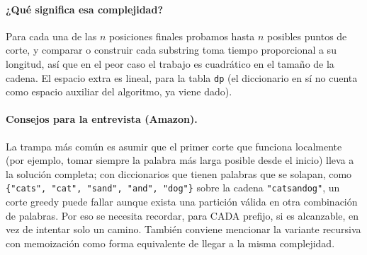 


\paragraph{¿Qué significa esa complejidad?} Para cada una de las $n$
posiciones finales probamos hasta $n$ posibles puntos de corte, y comparar o
construir cada substring toma tiempo proporcional a su longitud, así que en
el peor caso el trabajo es cuadrático en el tamaño de la cadena. El espacio
extra es lineal, para la tabla \texttt{dp} (el diccionario en sí no cuenta
como espacio auxiliar del algoritmo, ya viene dado).

\paragraph{Consejos para la entrevista (Amazon).} La trampa más común es
asumir que el primer corte que funciona localmente (por ejemplo, tomar
siempre la palabra más larga posible desde el inicio) lleva a la solución
completa; con diccionarios que tienen palabras que se solapan, como
\texttt{\{"cats", "cat", "sand", "and", "dog"\}} sobre la cadena
\texttt{"catsandog"}, un corte greedy puede fallar aunque exista una
partición válida en otra combinación de palabras. Por eso se necesita
recordar, para CADA prefijo, si es alcanzable, en vez de intentar solo un
camino. También conviene mencionar la variante recursiva con memoización
como forma equivalente de llegar a la misma complejidad.
